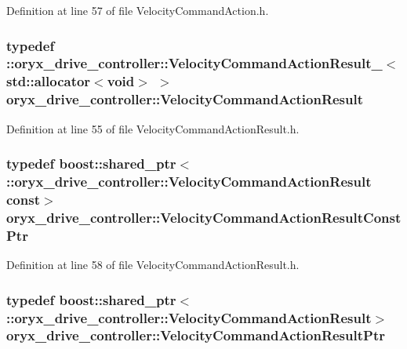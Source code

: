 \-Definition at line 57 of file \-Velocity\-Command\-Action.\-h.

\subsubsection[{\-Velocity\-Command\-Action\-Result}]{\setlength{\rightskip}{0pt plus 5cm}typedef \-::{\bf oryx\-\_\-drive\-\_\-controller\-::\-Velocity\-Command\-Action\-Result\-\_\-}$<$std\-::allocator$<$void$>$ $>$ {\bf oryx\-\_\-drive\-\_\-controller\-::\-Velocity\-Command\-Action\-Result}}\label{namespaceoryx__drive__controller_ab49540ffbfebe7517620062b87945ffb}


\-Definition at line 55 of file \-Velocity\-Command\-Action\-Result.\-h.

\subsubsection[{\-Velocity\-Command\-Action\-Result\-Const\-Ptr}]{\setlength{\rightskip}{0pt plus 5cm}typedef boost\-::shared\-\_\-ptr$<$ \-::{\bf oryx\-\_\-drive\-\_\-controller\-::\-Velocity\-Command\-Action\-Result} const$>$ {\bf oryx\-\_\-drive\-\_\-controller\-::\-Velocity\-Command\-Action\-Result\-Const\-Ptr}}\label{namespaceoryx__drive__controller_a175cde75818f148683a57af10bd5f527}


\-Definition at line 58 of file \-Velocity\-Command\-Action\-Result.\-h.

\subsubsection[{\-Velocity\-Command\-Action\-Result\-Ptr}]{\setlength{\rightskip}{0pt plus 5cm}typedef boost\-::shared\-\_\-ptr$<$ \-::{\bf oryx\-\_\-drive\-\_\-controller\-::\-Velocity\-Command\-Action\-Result}$>$ {\bf oryx\-\_\-drive\-\_\-controller\-::\-Velocity\-Command\-Action\-Result\-Ptr}}\label{namespaceoryx__drive__controller_a2f7ba6e6771b037cdd6be9288731ca57}


